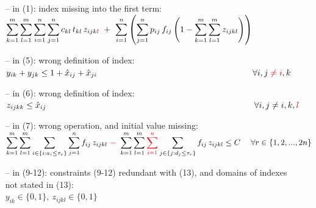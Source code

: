\documentclass[preprint,12pt,authoryear]{elsarticle}
\begin{document}
  \begin{itemize}
      \item [--] in (1): index missing into the first term:       \vspace{2mm} \\
      $\displaystyle\sum\limits^{m}_{k=1} \sum^{m}_{l=1} \sum^{n}_{i=1} \sum^{n}_{j=1} c_{kl} \, t_{kl} \, z_{ijk{\color{red}l}} \ + \ \sum^{n}_{i=1}\left( \sum^{n}_{j=1} p_{ij} \, f_{ij} \left( 1-\sum^{m}_{k=1} \sum^{m}_{l=1} z_{ijkl} \right) \right)$
      \vspace{2mm}

      \item [--] in (5): wrong definition of index:       \vspace{2mm} \\
      $y_{ik} + y_{jk} \leq 1 + \hat{x}_{ij} + \hat{x}_{ji} \hspace{64.5mm} \forall i,j \color{red}\neq i \color{black},k$
      \vspace{2mm}      
      
      \item [--] in (6):  wrong definition of index:       \vspace{2mm} \\
      $z_{ijkk} \leq \hat{x}_{ij} \hspace{86mm} \forall i,j \neq i,k,\color{red}{l}\color{black}$
      \vspace{2mm}

      \item [--] in (7):  wrong operation, and initial value missing:       \vspace{2mm} \\
      $\displaystyle\sum\limits_{k=1}^{m} \sum_{l=1}^{m} \sum_{i\in\{i:a_{i} \le \tau_r\}} \sum_{j=1}^{n} f_{ij} \, z_{ijkl} \ \color{red}{-}\color{black} \ \sum_{k=1}^{m} \sum_{l=1}^{m} \color{red}\sum_{i=1}^{n}\color{black} \sum_{j\in\{j:d_{j} \le \tau_r\}} f_{ij} \, z_{ijkl} \le  C \hspace{1mm} \quad \forall r \in \{1,2,...,2n\}$
      \vspace{2mm}

      \item [--] in (9-12):  constraints (9-12) redundant with (13), and domains of indexes not stated in (13):       \vspace{2mm} \\
      $y_{ik} \in \{0,1\}, \ z_{ijkl} \in \{0,1\}$
      \vspace{2mm}
  \end{itemize}
 
\end{document}
